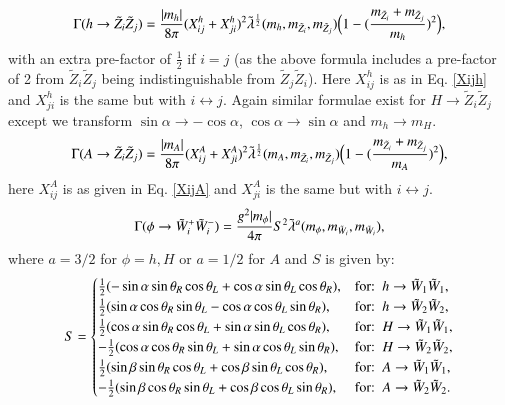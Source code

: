 \documentclass[final,3p,times]{elsarticle}
\begin{document}
\begin{equation}\label{hneutneut}
\Gamma (h \rightarrow \tilde{Z}_i \tilde{Z}_j) = {|m_h| \over 8\pi} (X_{ij}^{h} + X_{ji}^{h})^2 \tilde{\lambda}^{1 \over 2} (m_h,m_{\tilde{Z}_i}, m_{\tilde{Z}_j}) \Big(1 - ({m_{\tilde{Z}_i} + m_{\tilde{Z}_j} \over m_h})^2\Big),
\end{equation} 
with an extra pre-factor of $\frac{1}{2}$ if $i=j$ (as the above formula
includes a pre-factor of 2 from $\tilde{Z}_i \tilde{Z}_j$ being
indistinguishable from $\tilde{Z}_j \tilde{Z}_i$). 
Here $X_{ij}^{h}$ is as in Eq. \eqref{Xijh} and $X_{ji}^{h}$ is the same but with $i \leftrightarrow j$.
Again similar formulae exist for $H \rightarrow \tilde{Z}_i \tilde{Z}_j$ except we transform $\sin\alpha \rightarrow -\cos\alpha$,  $\cos\alpha \rightarrow \sin\alpha$ and $m_h \rightarrow m_H$.
\begin{equation}\label{Aneutneut}
\Gamma (A \rightarrow \tilde{Z}_i \tilde{Z}_j) = {|m_A| \over 8\pi} (X_{ij}^{A} + X_{ji}^{A})^2 \tilde{\lambda}^{1 \over 2} (m_A,m_{\tilde{Z}_i}, m_{\tilde{Z}_j}) \Big(1 - ({m_{\tilde{Z}_i} + m_{\tilde{Z}_j} \over m_A})^2\Big),
\end{equation} 
here $X_{ij}^{A}$ is as given in Eq. \eqref{XijA} and $X_{ji}^{A}$ is the same but with $i \leftrightarrow j$.
\begin{equation}\label{phichch}
\Gamma (\phi \rightarrow \tilde{W}_i^+ \tilde{W}_i^-) = {g^2 |m_\phi| \over 4\pi} S^2  \tilde{\lambda}^{a} (m_\phi,m_{\tilde{W}_i}, m_{\tilde{W}_i}) ,
\end{equation} 
where $a=3/2$ for $\phi= h, H$ or $a=1/2$ for $A$ and $S$ is given by:
\begin{equation}
S = \begin{cases}
  	{1 \over 2} (-\sin \alpha \sin \theta_R \cos \theta_L + \cos \alpha \sin \theta_L \cos \theta_R), & $for$ :\ h \rightarrow \tilde{W}_1 \tilde{W}_1, \\
  	{1 \over 2} (\sin \alpha \cos \theta_R \sin \theta_L - \cos \alpha \cos \theta_L \sin \theta_R), & $for$ :\ h \rightarrow \tilde{W}_2 \tilde{W}_2, \\
  	{1 \over 2} (\cos \alpha \sin \theta_R \cos \theta_L + \sin \alpha \sin \theta_L \cos \theta_R), & $for$ :\ H \rightarrow \tilde{W}_1 \tilde{W}_1, \\
  	-{1 \over 2} (\cos \alpha \cos \theta_R \sin \theta_L + \sin \alpha \cos \theta_L \sin \theta_R), & $for$ :\ H \rightarrow \tilde{W}_2 \tilde{W}_2, \\
  	{1 \over 2} (\sin \beta \sin \theta_R \cos \theta_L + \cos \beta \sin \theta_L \cos \theta_R), & $for$ :\ A \rightarrow \tilde{W}_1 \tilde{W}_1, \\
  	-{1 \over 2} (\sin \beta \cos \theta_R \sin \theta_L + \cos \beta \cos \theta_L \sin \theta_R), & $for$ :\ A \rightarrow \tilde{W}_2 \tilde{W}_2. \\
  \end{cases}
\end{equation}
\end{document}
